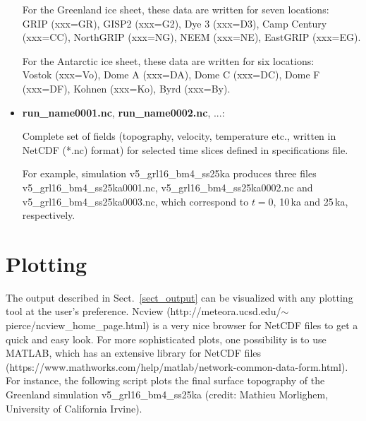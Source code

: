 \documentclass[12pt,a4paper]{article}
\begin{document}
\begin{itemize}
For the Greenland ice sheet, these data are written for seven locations:
\\
GRIP (xxx=GR), GISP2 (xxx=G2), Dye 3 (xxx=D3), Camp Century (xxx=CC), NorthGRIP (xxx=NG), NEEM (xxx=NE), EastGRIP (xxx=EG).

For the Antarctic ice sheet, these data are written for six locations:
\\
Vostok (xxx=Vo), Dome A (xxx=DA), Dome C (xxx=DC), Dome F (xxx=DF), Kohnen (xxx=Ko), Byrd (xxx=By).

\item \textbf{run\_name0001.nc}, \textbf{run\_name0002.nc}, ...:

Complete set of fields (topography, velocity, temperature etc., written in NetCDF (*.nc) format) for selected time slices defined in specifications file.

For example, simulation v5\_grl16\_bm4\_ss25ka produces three files v5\_grl16\_bm4\_\-ss25ka0001.nc, v5\_grl16\_bm4\_ss25ka0002.nc and v5\_grl16\_bm4\_ss25ka0003.nc, which correspond to $t=0$, 10\,ka and 25\,ka, respectively.

\end{itemize}



\section{Plotting}
\label{sect_plotting}

The output described in Sect.~\ref{sect_output} can be visualized with any plotting tool at the user's preference. Ncview (http://meteora.ucsd.edu/$\sim${}pierce/ncview\_home\_page.html) is a very nice browser for NetCDF files to get a quick and easy look. For more sophisticated plots, one possibility is to use MATLAB, which has an extensive library for NetCDF files (https://www.mathworks.com/help/matlab/network-common-data-form.html). For instance, the following script plots the final surface topography of the Greenland simulation v5\_grl16\_bm4\_ss25ka (credit: Mathieu Morlighem, University of California Irvine).

\vspace*{2ex}
\end{document}

